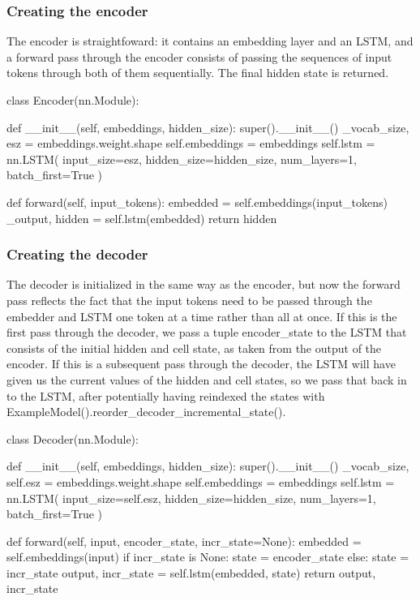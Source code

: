 \subsubsection*{Creating the encoder}

The encoder is straightfoward\+: it contains an embedding layer and an L\+S\+TM, and a forward pass through the encoder consists of passing the sequences of input tokens through both of them sequentially. The final hidden state is returned.


\begin{DoxyCode}
class Encoder(nn.Module):

    def \_\_init\_\_(self, embeddings, hidden\_size):
        super().\_\_init\_\_()
        \_vocab\_size, esz = embeddings.weight.shape
        self.embeddings = embeddings
        self.lstm = nn.LSTM(
            input\_size=esz, hidden\_size=hidden\_size, num\_layers=1, batch\_first=True
        )

    def forward(self, input\_tokens):
        embedded = self.embeddings(input\_tokens)
        \_output, hidden = self.lstm(embedded)
        return hidden
\end{DoxyCode}


\subsubsection*{Creating the decoder}

The decoder is initialized in the same way as the encoder, but now the forward pass reflects the fact that the input tokens need to be passed through the embedder and L\+S\+TM one token at a time rather than all at once. If this is the first pass through the decoder, we pass a tuple {\ttfamily encoder\+\_\+state} to the L\+S\+TM that consists of the initial hidden and cell state, as taken from the output of the encoder. If this is a subsequent pass through the decoder, the L\+S\+TM will have given us the current values of the hidden and cell states, so we pass that back in to the L\+S\+TM, after potentially having reindexed the states with {\ttfamily Example\+Model().reorder\+\_\+decoder\+\_\+incremental\+\_\+state()}.


\begin{DoxyCode}
class Decoder(nn.Module):

    def \_\_init\_\_(self, embeddings, hidden\_size):
        super().\_\_init\_\_()
        \_vocab\_size, self.esz = embeddings.weight.shape
        self.embeddings = embeddings
        self.lstm = nn.LSTM(
            input\_size=self.esz, hidden\_size=hidden\_size, num\_layers=1, batch\_first=True
        )

    def forward(self, input, encoder\_state, incr\_state=None):
        embedded = self.embeddings(input)
        if incr\_state is None:
            state = encoder\_state
        else:
            state = incr\_state
        output, incr\_state = self.lstm(embedded, state)
        return output, incr\_state
\end{DoxyCode}


